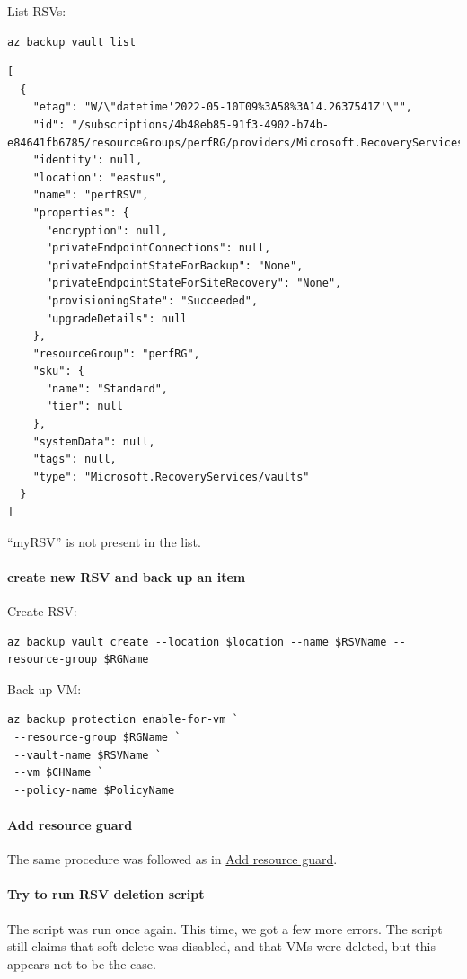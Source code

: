 List RSVs:
\begin{verbatim}
az backup vault list
\end{verbatim}

\begin{verbatim}
[
  {
    "etag": "W/\"datetime'2022-05-10T09%3A58%3A14.2637541Z'\"",
    "id": "/subscriptions/4b48eb85-91f3-4902-b74b-e84641fb6785/resourceGroups/perfRG/providers/Microsoft.RecoveryServices/vaults/perfRSV",
    "identity": null,
    "location": "eastus",
    "name": "perfRSV",
    "properties": {
      "encryption": null,
      "privateEndpointConnections": null,
      "privateEndpointStateForBackup": "None",
      "privateEndpointStateForSiteRecovery": "None",
      "provisioningState": "Succeeded",
      "upgradeDetails": null
    },
    "resourceGroup": "perfRG",
    "sku": {
      "name": "Standard",
      "tier": null
    },
    "systemData": null,
    "tags": null,
    "type": "Microsoft.RecoveryServices/vaults"
  }
]
\end{verbatim}

``myRSV'' is not present in the list.

\paragraph{create new RSV and back up an item}
\label{sec:org3570275}
Create RSV:
\begin{verbatim}
az backup vault create --location $location --name $RSVName --resource-group $RGName
\end{verbatim}

Back up VM:
\begin{verbatim}
az backup protection enable-for-vm `
 --resource-group $RGName `
 --vault-name $RSVName `
 --vm $CHName `
 --policy-name $PolicyName
\end{verbatim}

\paragraph{Add resource guard}
\label{sec:orgc3c211b}
The same procedure was followed as in \hyperref[sec:org4eeccf2]{Add resource guard}.

\paragraph{Try to run RSV deletion script}
\label{sec:orgbb61506}
The script was run once again.
This time, we got a few more errors.
The script still claims that soft delete was disabled,
and that VMs were deleted, but this appears not to be the case.


